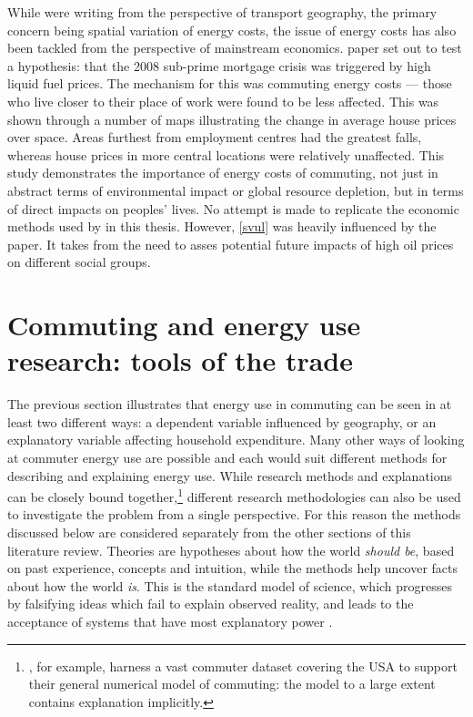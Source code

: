 While \citet{Boussauw2009} were writing from the perspective of transport
geography, the primary concern being spatial variation of energy costs,
the issue of energy costs has also been tackled from the perspective of
mainstream economics. \citet{Sexton2011} paper set out to
test a hypothesis: that the 2008 sub-prime mortgage crisis was triggered
by high liquid fuel prices. The mechanism for this was commuting energy costs ---
those who live closer to their place of work were found to be less affected.
This was shown through a number of maps illustrating the change in average
house prices over space. Areas furthest from employment centres had the greatest
falls, whereas house prices in more central locations were relatively unaffected.
This study demonstrates the importance of energy costs of commuting,
not just in abstract terms of environmental impact or global resource depletion,
but in terms of direct impacts on peoples' lives. No attempt is made to
replicate the economic methods used by \citet{Sexton2011} in this thesis.
However, \cref{svul} was heavily influenced by the paper. It takes from
\citet{Sexton2011} the need to asses potential future impacts of high oil prices
on different social groups.

\section{Commuting and energy use research: tools of the trade}
\label{s:tools}
The previous section illustrates that energy use in commuting can be seen in 
at least two different ways: a dependent variable influenced by geography, or
an explanatory variable affecting household expenditure.
Many other ways of looking at commuter energy use are possible and each
would suit different methods for describing and explaining
energy use. While research methods
and explanations can be closely bound
together,\footnote{\citet{Simini2012}, for
example, harness a vast commuter dataset covering the USA to support their
general numerical model of commuting: the model to a large extent
contains explanation implicitly.
}
different research methodologies
can also be used to investigate the problem from a single perspective.
For this reason the methods discussed below
are considered separately from the other sections of this literature review.
Theories are hypotheses about how the world \emph{should be}, based on
past experience, concepts and intuition, while
the methods help uncover facts about how the world \emph{is}. This is the
standard model of science, which progresses by falsifying ideas which fail to
explain observed reality, and leads to the acceptance of systems that have most
explanatory power \citep{Popper1959}.


